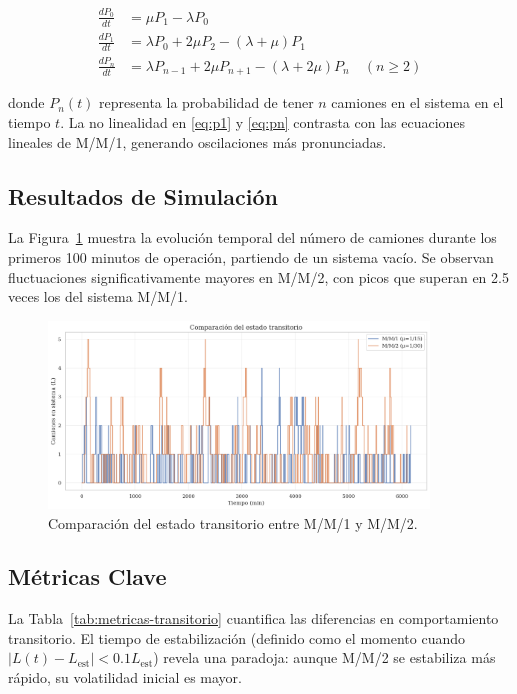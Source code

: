 \documentclass[12pt, a4paper]{article}
\begin{document}
    \begin{align}
    	\frac{dP_0}{dt} &= \mu P_1 - \lambda P_0 \label{eq:p0} \\
    	\frac{dP_1}{dt} &= \lambda P_0 + 2\mu P_2 - (\lambda + \mu)P_1 \label{eq:p1} \\
    	\frac{dP_n}{dt} &= \lambda P_{n-1} + 2\mu P_{n+1} - (\lambda + 2\mu)P_n \quad (n \geq 2) \label{eq:pn}
    \end{align}
    
    donde $P_n(t)$ representa la probabilidad de tener $n$ camiones en el sistema en el tiempo $t$. La no linealidad en \eqref{eq:p1} y \eqref{eq:pn} contrasta con las ecuaciones lineales de M/M/1, generando oscilaciones más pronunciadas.
    
    \subsection{Resultados de Simulación}
    La Figura~\ref{fig:transitorio} muestra la evolución temporal del número de camiones durante los primeros 100 minutos de operación, partiendo de un sistema vacío. Se observan fluctuaciones significativamente mayores en M/M/2, con picos que superan en 2.5 veces los del sistema M/M/1.
    
    \begin{figure}[h]
    	\centering
    	\includegraphics[width=0.9\textwidth]{figures/hipotesis5_transitorio.png}
    	\caption{Comparación del estado transitorio entre M/M/1 y M/M/2.}
    	\label{fig:transitorio}
    \end{figure}
    
    \subsection{Métricas Clave}
    La Tabla~\ref{tab:metricas-transitorio} cuantifica las diferencias en comportamiento transitorio. El tiempo de estabilización (definido como el momento cuando $|L(t) - L_{\text{est}}| < 0.1L_{\text{est}}$) revela una paradoja: aunque M/M/2 se estabiliza más rápido, su volatilidad inicial es mayor.
    
\end{document}
